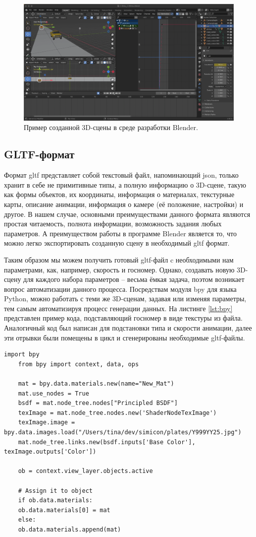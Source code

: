 \documentclass[specification,annotation,times]{itmo-student-thesis}
\begin{document}
	\begin{figure}[!ht]
		\caption{Пример созданной 3D-сцены в среде разработки Blender.}\label{img:blender}
		\includegraphics[width=0.85\linewidth]{../png/blender.png}
		\centering
	\end{figure}
	
	\subsection{GLTF-формат}
	Формат gltf представляет собой текстовый файл, напоминающий json, только хранит в себе не примитивные типы, а полную информацию о 3D-сцене, такую как формы объектов, их координаты, информация о материалах, текстурные карты, описание анимации, информация о камере (её положение, настройки) и другое. В нашем случае, основными преимуществами данного формата являются простая читаемость, полнота информации, возможность задания любых параметров. А преимуществом работы в программе Blender является то, что можно легко экспортировать созданную сцену в необходимый gltf формат.
	
	Таким образом мы можем получить готовый gltf-файл c необходимыми нам параметрами, как, например, скорость и госномер. Однако, создавать новую 3D-сцену для каждого набора параметров – весьма ёмкая задача, поэтом возникает вопрос автоматизации данного процесса. Посредствам модуля bpy для языка Python, можно работать с теми же 3D-сценам, задавая или изменяя параметры, тем самым автоматизируя процесс генерации данных. На листинге \ref{lst:bpy} представлен пример кода, подставляющий госномер в виде текстуры из файла. Аналогичный код был написан для подстановки типа и скорости анимации, далее эти отрывки были помещены в цикл и сгенерированы необходимые gltf-файлы.
	
	
	\begin{lstlisting}[float=!h,caption={Пример скрипта для подстановки ГРЗ из файла на объект в 3D-сцене.},label={lst:bpy}]
	import bpy
	from bpy import context, data, ops
	
	mat = bpy.data.materials.new(name="New_Mat")
	mat.use_nodes = True
	bsdf = mat.node_tree.nodes["Principled BSDF"]
	texImage = mat.node_tree.nodes.new('ShaderNodeTexImage')
	texImage.image = bpy.data.images.load("/Users/tina/dev/simicon/plates/Y999YY25.jpg")
	mat.node_tree.links.new(bsdf.inputs['Base Color'], texImage.outputs['Color'])
	
	ob = context.view_layer.objects.active
	
	# Assign it to object
	if ob.data.materials:
	ob.data.materials[0] = mat
	else:
	ob.data.materials.append(mat)
	\end{lstlisting}
	
\end{document}
